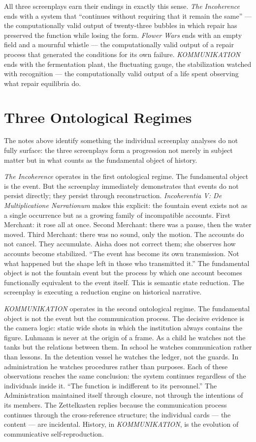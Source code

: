 \documentclass[11pt, a4paper]{article}
\theoremstyle{definition}
\theoremstyle{remark}
\begin{document}
All three screenplays earn their endings in exactly this sense. \textit{The
Incoherence} ends with a system that ``continues without requiring that it
remain the same'' --- the computationally valid output of twenty-three
bubbles in which repair has preserved the function while losing the form.
\textit{Flower Wars} ends with an empty field and a mournful whistle ---
the computationally valid output of a repair process that generated the
conditions for its own failure. \textit{KOMMUNIKATION} ends with the
fermentation plant, the fluctuating gauge, the stabilization watched with
recognition --- the computationally valid output of a life spent observing
what repair equilibria do.

\section{Three Ontological Regimes}

The notes above identify something the individual screenplay analyses do not
fully surface: the three screenplays form a progression not merely in subject
matter but in what counts as the fundamental object of history.

\textit{The Incoherence} operates in the first ontological regime. The
fundamental object is the event. But the screenplay immediately demonstrates
that events do not persist directly; they persist through reconstruction.
\textit{Incoherentia V: De Multiplicatione Narrationum} makes this explicit:
the fountain event exists not as a single occurrence but as a growing family
of incompatible accounts. First Merchant: it rose all at once. Second Merchant:
there was a pause, then the water moved. Third Merchant: there was no sound,
only the motion. The accounts do not cancel. They accumulate. Aisha does not
correct them; she observes how accounts become stabilized. ``The event has
become its own transmission. Not what happened but the shape left in those
who transmitted it.'' The fundamental object is not the fountain event but
the process by which one account becomes functionally equivalent to the event
itself. This is semantic state reduction. The screenplay is executing a
reduction engine on historical narrative.

\textit{KOMMUNIKATION} operates in the second ontological regime. The
fundamental object is not the event but the communication process.
The decisive evidence is the camera logic: static wide shots in which the
institution always contains the figure. Luhmann is never at the origin of
a frame. As a child he watches not the tanks but the relations between them.
In school he watches communication rather than lessons. In the detention
vessel he watches the ledger, not the guards. In administration he watches
procedures rather than purposes. Each of these observations reaches the
same conclusion: the system continues regardless of the individuals inside
it. ``The function is indifferent to its personnel.'' The Administration
maintained itself through closure, not through the intentions of its members.
The Zettelkasten replies because the communication process continues through
the cross-reference structure; the individual cards --- the content --- are
incidental. History, in \textit{KOMMUNIKATION}, is the evolution of
communicative self-reproduction.
\end{document}
